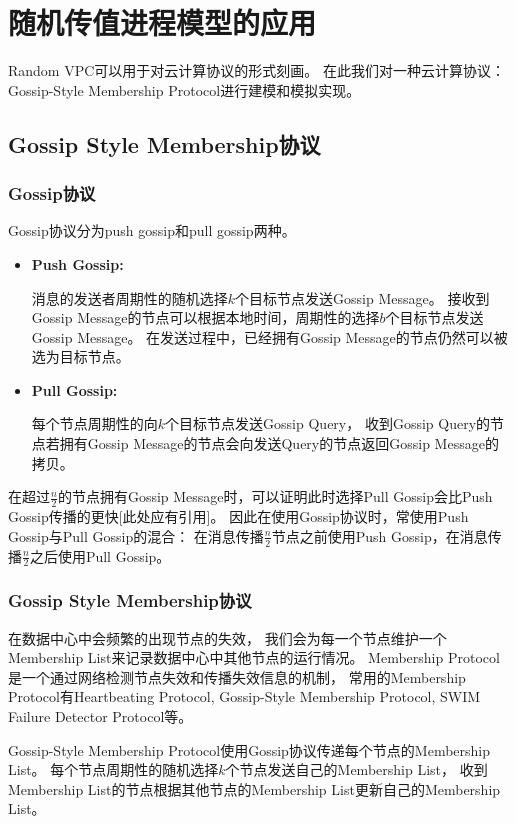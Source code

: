 
\chapter{随机传值进程模型的应用}

Random VPC可以用于对云计算协议的形式刻画。
在此我们对一种云计算协议：Gossip-Style Membership Protocol进行建模和模拟实现。

\section{Gossip Style Membership协议}
\subsection{Gossip协议}
Gossip协议分为push gossip和pull gossip两种。
\begin{itemize}
   \item {
      \textbf{Push Gossip:} 
      
      消息的发送者周期性的随机选择$k$个目标节点发送Gossip Message。
      接收到Gossip Message的节点可以根据本地时间，周期性的选择$b$个目标节点发送Gossip Message。
      在发送过程中，已经拥有Gossip Message的节点仍然可以被选为目标节点。
   }
   \item {
      \textbf{Pull Gossip:}

      每个节点周期性的向$k$个目标节点发送Gossip Query，
      收到Gossip Query的节点若拥有Gossip Message的节点会向发送Query的节点返回Gossip Message的拷贝。
   }
\end{itemize}

在超过$\frac{n}{2}$的节点拥有Gossip Message时，可以证明此时选择Pull Gossip会比Push Gossip传播的更快[此处应有引用]。
因此在使用Gossip协议时，常使用Push Gossip与Pull Gossip的混合：
在消息传播$\frac{n}{2}$节点之前使用Push Gossip，在消息传播$\frac{n}{2}$之后使用Pull Gossip。

\subsection{Gossip Style Membership协议}

在数据中心中会频繁的出现节点的失效，
我们会为每一个节点维护一个Membership List来记录数据中心中其他节点的运行情况。
Membership Protocol是一个通过网络检测节点失效和传播失效信息的机制，
常用的Membership Protocol有Heartbeating Protocol, Gossip-Style Membership Protocol, SWIM Failure Detector Protocol等。

Gossip-Style Membership Protocol使用Gossip协议传递每个节点的Membership List。
每个节点周期性的随机选择$k$个节点发送自己的Membership List，
收到Membership List的节点根据其他节点的Membership List更新自己的Membership List。

